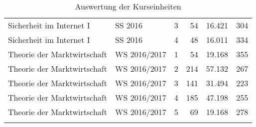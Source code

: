 \begin{longtable}{lllrrr}
Sicherheit im Internet I & SS 2016 & 3 & 54 & 16.421 & 304\\
Sicherheit im Internet I & SS 2016 & 4 & 48 & 16.011 & 334\\
Theorie der Marktwirtschaft & WS 2016/2017 & 1 & 54 & 19.168 & 355\\
Theorie der Marktwirtschaft & WS 2016/2017 & 2 & 214 & 57.132 & 267\\
Theorie der Marktwirtschaft & WS 2016/2017 & 3 & 141 & 31.494 & 223\\
Theorie der Marktwirtschaft & WS 2016/2017 & 4 & 185 & 47.198 & 255\\
Theorie der Marktwirtschaft & WS 2016/2017 & 5 & 69 & 19.168 & 278\\
\caption{Auswertung der Kurseinheiten}
\label{tab:AnalyseDerKurseinheiten}
\end{longtable}
\normalsize

